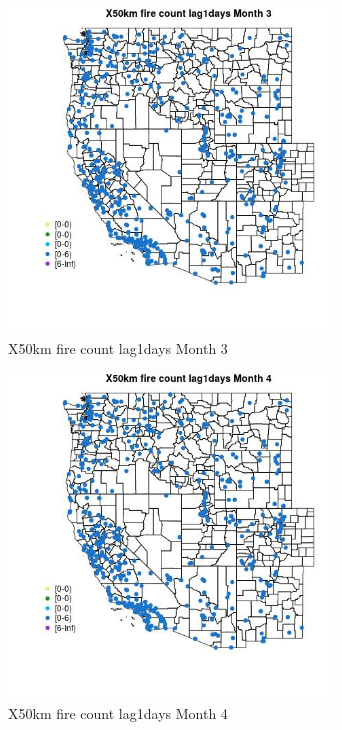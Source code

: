 \begin{figure} 
\centering  
\includegraphics[width=0.77\textwidth]{Code_Outputs/Report_ML_input_PM25_Step4_part_e_de_duplicated_aves_compiled_2019-05-14wNAs_MapObsMo3X50km_fire_count_lag1days.jpg} 
\caption{\label{fig:Report_ML_input_PM25_Step4_part_e_de_duplicated_aves_compiled_2019-05-14wNAsMapObsMo3X50km_fire_count_lag1days}X50km fire count lag1days Month 3} 
\end{figure} 
 

\begin{figure} 
\centering  
\includegraphics[width=0.77\textwidth]{Code_Outputs/Report_ML_input_PM25_Step4_part_e_de_duplicated_aves_compiled_2019-05-14wNAs_MapObsMo4X50km_fire_count_lag1days.jpg} 
\caption{\label{fig:Report_ML_input_PM25_Step4_part_e_de_duplicated_aves_compiled_2019-05-14wNAsMapObsMo4X50km_fire_count_lag1days}X50km fire count lag1days Month 4} 
\end{figure} 
 

